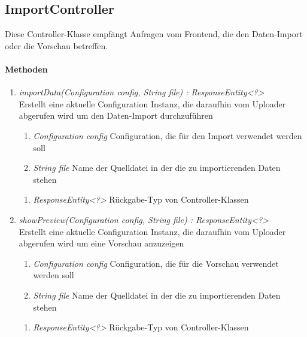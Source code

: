 \subsection*{ImportController}\label{ImpCon}
Diese Controller-Klasse empfängt Anfragen vom Frontend, die den Daten-Import oder die Vorschau betreffen.

\paragraph{Methoden}

\begin{enumerate}[+]
	\item \textit{ importData(Configuration config, String file) : ResponseEntity<?>}\\
	Erstellt eine aktuelle Configuration Instanz, die daraufhin vom Uploader abgerufen wird um den Daten-Import durchzuführen
	
	\begin{enumerate}[$\bullet$]
		\item \textit{Configuration config} Configuration, die für den Import verwendet werden soll
		\item \textit{String file} Name der Quelldatei in der die zu importierenden Daten stehen
	\end{enumerate}
	\vspace{-0.2cm}
	\begin{enumerate}[$\circ$]
		\item \textit{ResponseEntity<?>} Rückgabe-Typ von Controller-Klassen
	\end{enumerate}
	
	\item \textit{ showPreview(Configuration config, String file) : ResponseEntity<?>}\\
	Erstellt eine aktuelle Configuration Instanz, die daraufhin vom Uploader abgerufen wird um eine Vorschau anzuzeigen
	
	\begin{enumerate}[$\bullet$]
		\item \textit{Configuration config} Configuration, die für die Vorschau verwendet werden soll
		\item \textit{String file} Name der Quelldatei in der die zu importierenden Daten stehen
	\end{enumerate}
	\vspace{-0.2cm}
	\begin{enumerate}[$\circ$]
		\item \textit{ResponseEntity<?>} Rückgabe-Typ von Controller-Klassen
	\end{enumerate}
\end{enumerate}